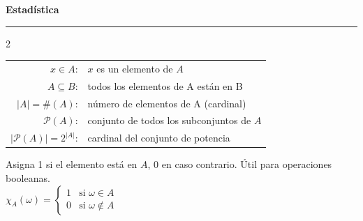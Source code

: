 \documentclass[10pt,a4paper]{article}
\begin{document}
\begin{center}
    {\Large \textbf{Estadística}} \\[4pt]
    \small %
\end{center}

\newcommand{\sectiontitle}[1]{\par\hrule\vspace{10pt}{\Large\bfseries #1}\par}

\sectiontitle{Conjuntos}


\begin{multicols}{2}
    \begin{tcolorbox}[title=Teoría de Conjuntos, equal height group=CONJ1]
        \begin{tabular}{rl}
            $x \in A$: & $x$ es un elemento de $A$ \\
            $A \subseteq B$: & todos los elementos de A están en B \\
            $|A| = \#(A)$: & número de elementos de A (cardinal) \\
            $\mathcal{P}(A)$: & conjunto de todos los subconjuntos de $A$ \\
            $|\mathcal{P}(A)| = 2^{|A|}$: & cardinal del conjunto de potencia \\
        \end{tabular}
    \end{tcolorbox}

    \begin{tcolorbox}[title=Función Característica, equal height group=CONJ1]
        Asigna 1 si el elemento está en $A$, 0 en caso contrario. Útil para operaciones booleanas. \\
        $ \chi_A(\omega) = \begin{cases} 1 & \text{si } \omega \in A \\ 0 & \text{si } \omega \notin A \end{cases}$
    \end{tcolorbox}
\end{multicols}
\end{document}
